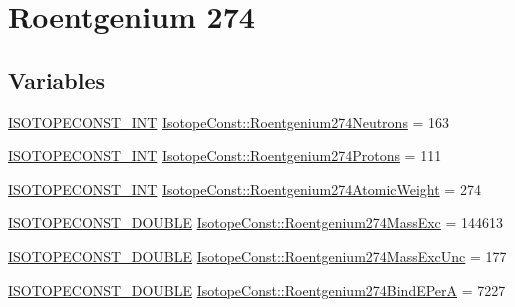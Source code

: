\hypertarget{group___isotope_const-_roentgenium-_rg274}{}\section{Roentgenium 274}
\label{group___isotope_const-_roentgenium-_rg274}
\subsection*{Variables}
\begin{DoxyCompactItemize}
\item 
\mbox{\hyperlink{group___isotope_const-_macros_ga5f18360b3e99483a35c32d789e62621c}{I\+S\+O\+T\+O\+P\+E\+C\+O\+N\+S\+T\+\_\+\+I\+NT}} \mbox{\hyperlink{group___isotope_const-_roentgenium-_rg274_ga3ff6a97e50aa2b422cd34affb4113f12}{Isotope\+Const\+::\+Roentgenium274\+Neutrons}} = 163
\item 
\mbox{\hyperlink{group___isotope_const-_macros_ga5f18360b3e99483a35c32d789e62621c}{I\+S\+O\+T\+O\+P\+E\+C\+O\+N\+S\+T\+\_\+\+I\+NT}} \mbox{\hyperlink{group___isotope_const-_roentgenium-_rg274_ga9d57aaff17daa8549e8b44de03f0e5af}{Isotope\+Const\+::\+Roentgenium274\+Protons}} = 111
\item 
\mbox{\hyperlink{group___isotope_const-_macros_ga5f18360b3e99483a35c32d789e62621c}{I\+S\+O\+T\+O\+P\+E\+C\+O\+N\+S\+T\+\_\+\+I\+NT}} \mbox{\hyperlink{group___isotope_const-_roentgenium-_rg274_ga5286b838b2f03be74c935ca421b0d836}{Isotope\+Const\+::\+Roentgenium274\+Atomic\+Weight}} = 274
\item 
\mbox{\hyperlink{group___isotope_const-_macros_ga8f45a7272ce02c0b4c65c44636ed719a}{I\+S\+O\+T\+O\+P\+E\+C\+O\+N\+S\+T\+\_\+\+D\+O\+U\+B\+LE}} \mbox{\hyperlink{group___isotope_const-_roentgenium-_rg274_ga929c8aed4112f249abf0b81267e6bc05}{Isotope\+Const\+::\+Roentgenium274\+Mass\+Exc}} = 144613
\item 
\mbox{\hyperlink{group___isotope_const-_macros_ga8f45a7272ce02c0b4c65c44636ed719a}{I\+S\+O\+T\+O\+P\+E\+C\+O\+N\+S\+T\+\_\+\+D\+O\+U\+B\+LE}} \mbox{\hyperlink{group___isotope_const-_roentgenium-_rg274_gaf22d48484f7702ee9ce56faf0f8ffc74}{Isotope\+Const\+::\+Roentgenium274\+Mass\+Exc\+Unc}} = 177
\item 
\mbox{\hyperlink{group___isotope_const-_macros_ga8f45a7272ce02c0b4c65c44636ed719a}{I\+S\+O\+T\+O\+P\+E\+C\+O\+N\+S\+T\+\_\+\+D\+O\+U\+B\+LE}} \mbox{\hyperlink{group___isotope_const-_roentgenium-_rg274_ga135540ff0a6a41e43d6a17d1f995a085}{Isotope\+Const\+::\+Roentgenium274\+Bind\+E\+PerA}} = 7227

\end{DoxyCompactItemize}
